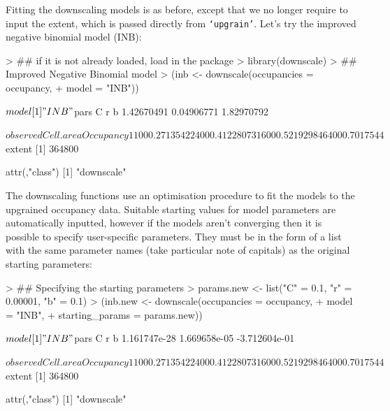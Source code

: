 \documentclass{article}[12pt, a4paper]
\begin{document}
Fitting the downscaling models is as before, except that we no longer require to input the extent, which is passed directly from \texttt{‘upgrain’}. Let’s try the improved negative binomial model (INB):

\begin{Schunk}
\begin{Sinput}
> ## if it is not already loaded, load in the package
> library(downscale)
> ## Improved Negative Binomial model
> (inb <- downscale(occupancies = occupancy,
+                   model = "INB"))
\end{Sinput}
\begin{Soutput}
$model
[1] "INB"

$pars
         C          r          b 
1.42670491 0.04906771 1.82970792 

$observed
  Cell.area Occupancy
1       100 0.2713542
2       400 0.4122807
3      1600 0.5219298
4      6400 0.7017544

$extent
[1] 364800

attr(,"class")
[1] "downscale"

\end{Soutput}
\end{Schunk}

The downscaling functions use an optimisation procedure to fit the models to the upgrained occupancy data. Suitable starting values for model parameters are automatically inputted, however if the models aren’t converging then it is possible to specify user-specific parameters. They must be in the form of a list with the same parameter names (take particular note of capitals) as the original starting parameters:

\begin{Schunk}
\begin{Sinput}
> ## Specifying the starting parameters
> params.new <- list("C" = 0.1, "r" = 0.00001, "b" = 0.1)
> (inb.new <- downscale(occupancies = occupancy,
+                       model = "INB",
+                       starting_params = params.new))
\end{Sinput}
\begin{Soutput}
$model
[1] "INB"

$pars
            C             r             b 
 1.161747e-28  1.669658e-05 -3.712604e-01 

$observed
  Cell.area Occupancy
1       100 0.2713542
2       400 0.4122807
3      1600 0.5219298
4      6400 0.7017544

$extent
[1] 364800

attr(,"class")
[1] "downscale"

\end{Soutput}
\end{Schunk}
\end{document}
